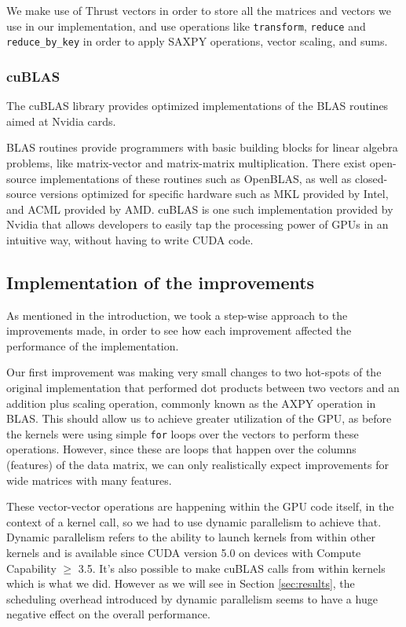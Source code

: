 \documentclass[11pt,a4paper]{article}
\begin{document}
We make use of Thrust vectors in order to store all the matrices and vectors we use
in our implementation, and use operations like \texttt{transform}, \texttt{reduce} and \texttt{reduce\_by\_key} in order to apply SAXPY operations, vector scaling, and sums.

\subsubsection{cuBLAS}

The cuBLAS library provides optimized implementations of the BLAS routines aimed at Nvidia cards.

BLAS routines provide programmers with basic building blocks for linear algebra problems, like
matrix-vector and matrix-matrix multiplication. There exist open-source implementations of these
routines such as OpenBLAS, as well as closed-source versions optimized for specific hardware such as MKL provided by Intel, and
ACML provided by AMD. cuBLAS is one such implementation provided by Nvidia that allows developers to easily
tap the processing power of GPUs in an intuitive way, without having to write CUDA code.

\subsection{Implementation of the improvements}

As mentioned in the introduction, we took a step-wise approach to the improvements made,
in order to see how each improvement affected the performance of the implementation.

Our first improvement was making very small changes to two hot-spots of the original
implementation that performed dot products between two vectors and an addition plus
scaling operation, commonly known as the AXPY operation in BLAS.
This should allow us to achieve greater utilization of the GPU, as before the kernels
were using simple \texttt{for} loops over the vectors to perform these operations.
However, since these are loops that happen over the columns (features) of the data matrix,
we can only realistically expect improvements for wide matrices with many features.

These vector-vector operations are happening within the GPU code itself, in the context of a
kernel call, so we had to use dynamic parallelism to achieve that. Dynamic parallelism
refers to the ability to launch kernels from within other kernels and is available
since CUDA version 5.0 on devices with Compute Capability $\ge$ 3.5. It's also possible
to make cuBLAS calls from within kernels which is what we did.
However as we will see in Section \ref{sec:results}, the scheduling overhead introduced by 
dynamic parallelism seems to have a huge negative effect on the overall performance.
\end{document}
